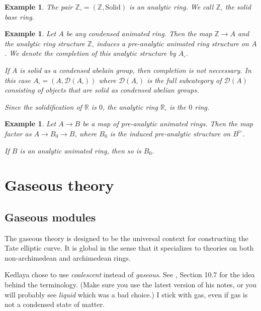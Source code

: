 \documentclass{article}
\theoremstyle{plain}
\newtheorem{exmp}[thm]{Example}
\theoremstyle{definition}
\theoremstyle{remark}
\newcommand{\huflag}{\triangleright}
\newcommand{\D}{\mathcal{D}}
\newcommand{\solid}{\square}
\begin{document}
\begin{exmp}
The pair $ \mathbb{Z}_{\solid} = (\mathbb{Z}, \mathrm{Solid}) $ is an analytic ring.
We call $ \mathbb{Z}_{\solid} $ the solid base ring.
\end{exmp}

\begin{exmp}
Let $ A $ be any condensed animated ring. Then the map $ \mathbb{Z}\to A $ and the analytic ring structure
$ \mathbb{Z}_{\solid} $ induces a pre-analytic animated ring structure on $ A $.
We denote the completion of this analytic structure by $ A _{\solid} $.

If $ A $ is solid as a condensed abelain group, then completion is not neccessary.
In this case $ A _{\solid} = (A, \D (A _{\solid})) $ where $ \D (A _{\solid}) $ is the full subcategory
of $ \D (A) $ consisting of objects that are solid as condensed abelian groups.

Since the solidification of $ \mathbb{R} $ is $ 0 $, the analytic ring $ \mathbb{R}_{\solid} $ is the $ 0 $ ring.
\end{exmp}

\begin{exmp}
Let $ A\to B $ be a map of pre-analytic animated rings.
Then the map factor as $ A \to B _{0}\to B $, where $ B _{0}$ is the induced pre-analytic
structure on $ B ^{\huflag} $.

If $ B $ is an analytic animated ring, then so is $ B _{0} $.
\end{exmp}

\section{Gaseous theory}

\subsection{Gaseous modules}

The gaseous theory is designed to be the universal context for constructing the Tate elliptic curve.
It is global in the sense that it specializes to theories on both non-archimedean and archimedean rings.

Kedlaya chose to use \emph{coalescent} instead of \emph{gaseous}.
See \cite{kedlaya}, Section 10.7 for the idea behind the terminology.
(Make sure you use the latest version of his notes, or you will probably see \emph{liquid} which was a bad choice.)
I stick with gas, even if gas is not a condensed state of matter.
\end{document}
